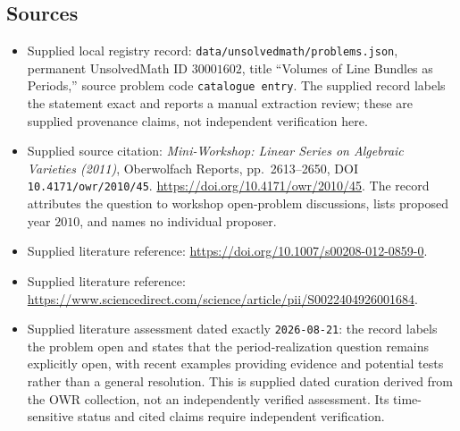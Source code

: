 \documentclass[11pt]{article}
\begin{document}
\subsection{Sources}
\begin{itemize}
\item Supplied local registry record: \texttt{data/unsolvedmath/problems.json}, permanent UnsolvedMath ID \(30001602\), title ``Volumes of Line Bundles as Periods,'' source problem code \texttt{catalogue entry}. The supplied record labels the statement exact and reports a manual extraction review; these are supplied provenance claims, not independent verification here.
\item Supplied source citation: \emph{Mini-Workshop: Linear Series on Algebraic Varieties (2011)}, Oberwolfach Reports, pp.\ 2613--2650, DOI \texttt{10.4171/owr/2010/45}. \url{https://doi.org/10.4171/owr/2010/45}. The record attributes the question to workshop open-problem discussions, lists proposed year \(2010\), and names no individual proposer.
\item Supplied literature reference: \url{https://doi.org/10.1007/s00208-012-0859-0}.
\item Supplied literature reference: \url{https://www.sciencedirect.com/science/article/pii/S0022404926001684}.
\item Supplied literature assessment dated exactly \texttt{2026-08-21}: the record labels the problem open and states that the period-realization question remains explicitly open, with recent examples providing evidence and potential tests rather than a general resolution. This is supplied dated curation derived from the OWR collection, not an independently verified assessment. Its time-sensitive status and cited claims require independent verification.
\end{itemize}
\end{document}
